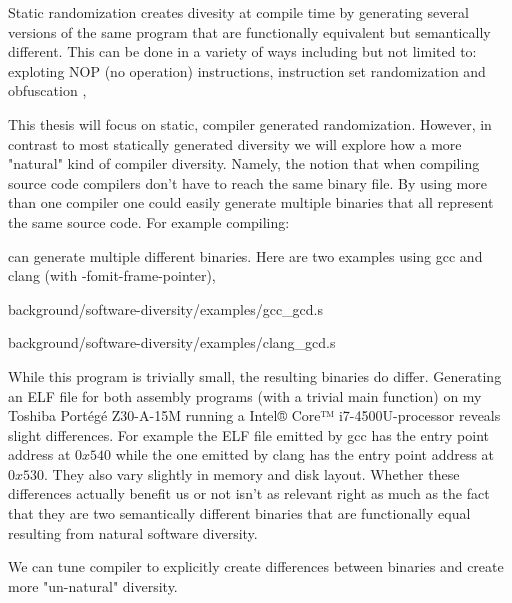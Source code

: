 Static randomization creates divesity at compile time by generating several versions of the
same program that are functionally equivalent but semantically different. This can be done
in a variety of ways including but not limited to: exploting NOP (no operation) instructions,
instruction set randomization and obfuscation \cite[Section~4.1.1]{survey},

This thesis will focus on static, compiler generated randomization. However, in contrast
to most statically generated diversity we will explore how a more "natural" kind of compiler
diversity. Namely, the notion that when compiling source code compilers don't have to reach
the same binary file. By using more than one compiler one could easily generate multiple
binaries that all represent the same source code. For example compiling:



can generate multiple different binaries. Here are two examples using gcc and clang (with
-fomit-frame-pointer),


{background/software-diversity/examples/gcc_gcd.s}


{background/software-diversity/examples/clang_gcd.s}

While this program is trivially small, the resulting binaries do differ. Generating an
ELF file for both assembly programs (with a trivial main function) on my Toshiba Portégé
Z30-A-15M running a Intel® Core™ i7-4500U-processor reveals slight differences. For example
the ELF file emitted by gcc has the entry point address at $0x540$ while the one emitted
by clang has the entry point address at $0x530$. They also vary slightly in memory and
disk layout. Whether these differences actually benefit us or not isn't as relevant right
as much as the fact that they are two semantically different binaries that are functionally equal
resulting from natural software diversity.

We can tune compiler to explicitly create differences between binaries and create more
"un-natural" diversity. 

